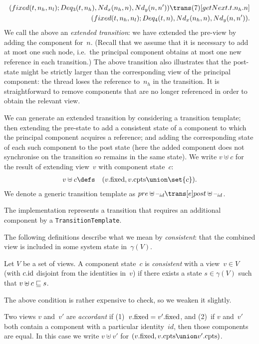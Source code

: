 \begin{equation}
\begin{align}
(fixed(t, n_h, n_l); Deq_3(t, n_h), \Node_x(n_h, n), \Node_y(n, n'))
  \trans(7)[getNext.t.n_h.n] \\
\qquad (fixed(t, n_h, n_l);   Deq_4(t, n), \Node_x(n_h, n), \Node_y(n, n')).
\label{trans:getNext}
\end{align}
\end{equation}
%
We call the above an \emph{extended transition}: we have extended the pre-view
by adding the component for~$n$.  (Recall that we assume that it is necessary
to add at most one such node, i.e.~the principal component obtains at most one
new reference in each transition.)  The above transition also illustrates that
the post-state might be strictly larger than the corresponding view of the
principal component: the thread loses the reference to~$n_h$ in the
transition.  It is straightforward to remove components that are no longer
referenced in order to obtain the relevant view.

We can generate an extended transition by considering a transition template;
then extending the pre-state to add a consistent state of a component to which
the principal component acquires a reference; and adding the corresponding
state of each such component to the post state (here the added component does
not synchronise on the transition so remains in the same state).  We write $v
\uplus c$ for the result of extending view~$v$ with component state~$c$:
\begin{eqnarray*}
v \uplus c & \defs & (v.\fixed, v.\cpts \union \set{c}).
\end{eqnarray*}
%
We denote a generic transition template as $pre \uplus \hole{id} \trans[e]
post \uplus \hole{id}$. 

\begin{impNote}
The implementation represents a transition that requires an
  additional component by a \texttt{TransitionTemplate}.
\end{impNote}

The following definitions describe what we mean by \emph{consistent}: that the
combined view is included in some system state in~$\gamma(V)$.
%
\begin{definition}
Let $V$ be a set of views.  A component state~$c$ is \emph{consistent} with a
view~$v \in V$ (with $c.\mathrm{id}$ disjoint from the identities in~$v$) if there
exists a state $s \in \gamma(V)$ such that $v \uplus c \sqsubseteq s$.
\end{definition}
%
The above condition is rather expensive to check, so we weaken it slightly. 
%
\begin{definition}
Two views $v$ and~$v'$ are \emph{accordant} if (1)~$v.\mathrm{fixed} = v'.\mathrm{fixed}$, and
(2)~if $v$ and~$v'$ both contain a component with a particular identity~$id$,
then those components are equal.  In this case we write $v \uplus v'$ for
$(v.\fixed, v.\cpts \union v'.\cpts)$.  
\end{definition}

